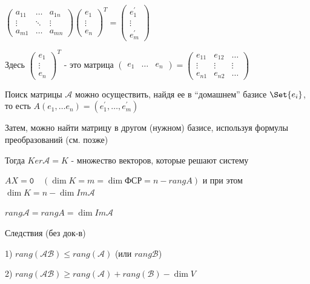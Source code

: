\documentclass[12pt]{article}
\begin{document}
    $\displaystyle \begin{pmatrix}
         a_{11} & \dots & a_{1n} \\
         \vdots & \ddots & \vdots \\
         a_{m1} & \dots & a_{mn}
    \end{pmatrix} \begin{pmatrix}
         e_1 \\
         \vdots \\
         e_n
    \end{pmatrix}^T = \begin{pmatrix}
         e_1^\prime \\
         \vdots \\
         e_m^\prime
    \end{pmatrix}$

    Здесь $\displaystyle \begin{pmatrix}
         e_1 \\
         \vdots \\
         e_n
    \end{pmatrix}^T$ - это матрица $\displaystyle \begin{pmatrix}
         e_1 & \dots & e_n
    \end{pmatrix} = \begin{pmatrix}
         e_{11} & e_{12} & \dots \\
         \vdots & \vdots & \vdots \\
         e_{n1} & e_{n2} & \dots
    \end{pmatrix}$

    \Nota Поиск матрицы $\mathcal{A}$ можно осуществить, найдя ее в \enquote{домашнем} базисе $\displaystyle \Set{e_i}$, то есть $\displaystyle A (e_1, \dots e_n) = (e_1^\prime, \dots, e_m^\prime)$

    Затем, можно найти матрицу в другом (нужном) базисе, используя формулы преобразований (см. \th позже)

    Тогда $Ker \mathcal{A} = K$ - множество векторов, которые решают систему

    $AX = \texttt{0} \quad (\dim K = m = \dim \text{ФСР} = n - rang A)$ и при этом $\dim K = n - \dim Im \mathcal{A}$

    $rang \mathcal{A} = rang A = \dim Im \mathcal{A}$

    Следствия (без док-в)

    1) $rang(\mathcal{AB}) \leq rang(\mathcal{A})$ (или $rang \mathcal{B}$)

    2) $rang(\mathcal{AB}) \geq rang(\mathcal{A}) + rang(\mathcal{B}) - \dim V$
\end{document}
